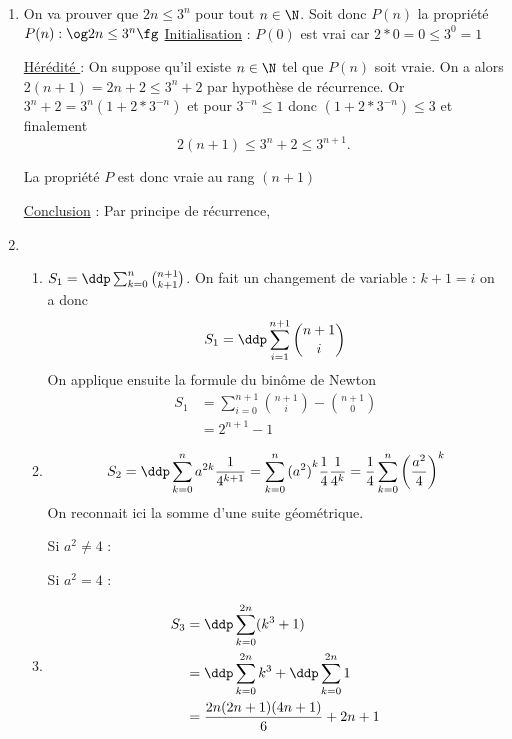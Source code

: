 \documentclass[a4paper, 11pt,reqno]{article}
\begin{document}
\begin{correction}
\begin{enumerate}


\item On va prouver que $2n\leq 3^n$ pour tout $n\in \N$. Soit donc $P(n)$ la propriété 
$P(n) : \og 2n\leq 3^n \fg $
\underline{Initialisation} : $P(0)$  est vrai car $2*0=0\leq 3^0=1$

\underline{Hérédité } : On suppose qu'il existe  $n\in \N$ tel que $P(n)$ soit vraie. On a alors $2(n+1) = 2n +2 \leq 3^n+2$ par hypothèse de récurrence.
Or $3^n+2 = 3^{n}(1+2*3^{-n})$ et pour $3^{-n}\leq 1$ donc $(1+2*3^{-n})\leq 3$ et finalement  $$2(n+1)\leq 3^n+2\leq 3^{n+1}.$$

La propriété $P$ est donc vraie au rang $(n+1)$ 

\underline{Conclusion} : Par principe de récurrence, 

\item 
\begin{enumerate}
\item $S_1=\ddp \sum_{k=0}^{n} \binom{n+1}{k+1}$. On fait un changement de variable : $k+1=i$ on a donc
$$S_1= \ddp \sum_{i=1}^{n+1} \binom{n+1}{i}$$
On applique ensuite la formule du binôme de Newton 
\begin{align*}
S_1&=  \sum_{i=0}^{n+1} \binom{n+1}{i}  - \binom{n+1}{0}\\
	&=2^{n+1} -1
\end{align*}

\item $$S_2 =\ddp \sum_{k=0}^{n} a^{2k}\frac{1}{4^{k+1}} =\sum_{k=0}^{n} {(a^{2})}^{k}\frac{1}{4}\frac{1}{4^{k}} =\frac{1}{4}\sum_{k=0}^{n} \left(\frac{a^{2}}{4}\right)^k $$
On reconnait ici la somme d'une suite géométrique.

Si $a^2\neq 4$ : 

Si $a^2=4 $ :


\item 
\begin{align*}
S_3&=\ddp \sum_{k=0}^{2n} (k^3+1) \\
&=\ddp \sum_{k=0}^{2n} k^3+ \ddp \sum_{k=0}^{2n} 1\\
&=\frac{2n(2n+1)(4n+1)}{6} + 2n+1
\end{align*}


\end{enumerate}
\end{enumerate}
\end{correction}
\end{document}
